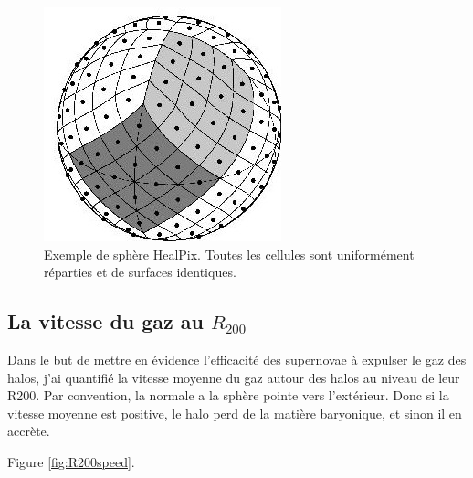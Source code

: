 \begin{figure}
	\centering
    \includegraphics[width=.45\linewidth]{img/03/healpix.jpg} 
    \caption[Sphère HealPix]{Exemple de sphère HealPix. Toutes les cellules sont uniformément réparties et de surfaces identiques.}
 	\label{fig:HealPix}
\end{figure}

\subsection{La vitesse du gaz au $R_{200}$}

Dans le but de mettre en évidence l'efficacité des supernovae à expulser le gaz des halos, j'ai quantifié la vitesse moyenne du gaz autour des halos au niveau de leur R200.
Par convention, la normale a la sphère pointe vers l'extérieur.
Donc si la vitesse moyenne est positive, le halo perd de la matière baryonique, et sinon il en accrète.


Figure \ref{fig:R200speed}.

